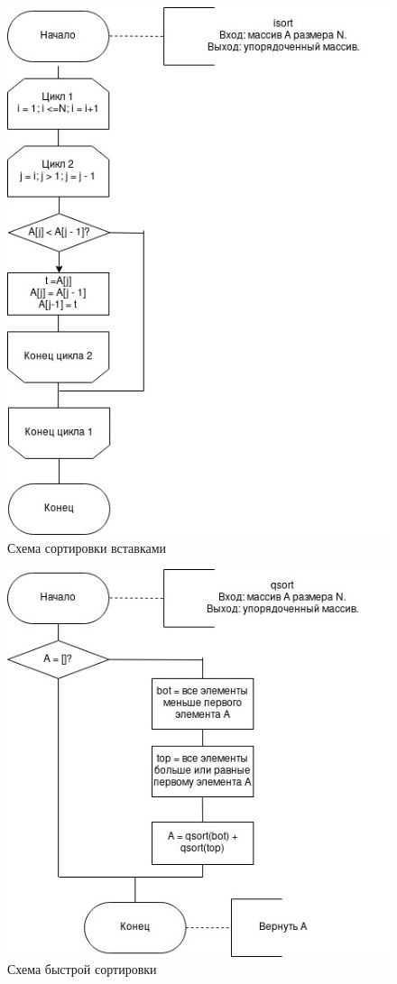 \documentclass[12pt]{report}
\begin{document}
\begin{figure}[h]
	\centering
	\includegraphics[width=0.9\linewidth]{isort.jpg}
	\caption{Схема сортировки вставками}
	\label{fig:mpr}
\end{figure}

\begin{figure}[h]
	\centering
	\includegraphics[width=1\linewidth]{qsort.jpg}
	\caption{Схема быстрой сортировки}
	\label{fig:mpr}
\end{figure}
\end{document}
